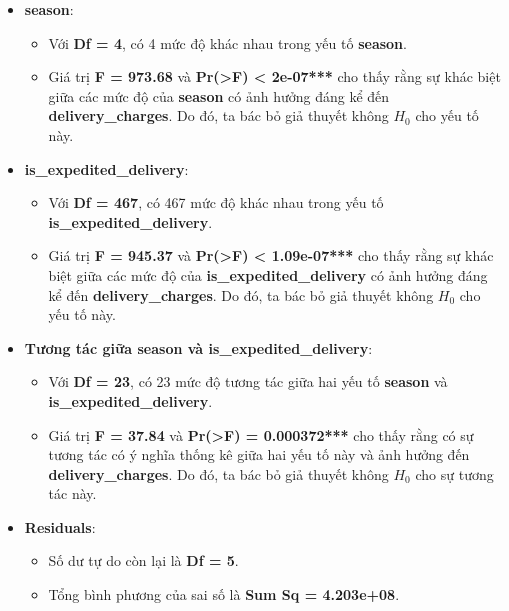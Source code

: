            \begin{itemize}
    \item \textbf{season}:
    \begin{itemize}
        \item Với \textbf{Df = 4}, có 4 mức độ khác nhau trong yếu tố \textbf{season}.
        \item Giá trị \textbf{F = 973.68} và \textbf{Pr(>F) < 2e-07***} cho thấy rằng sự khác biệt giữa các mức độ của \textbf{season} có ảnh hưởng đáng kể đến \textbf{delivery\_charges}. Do đó, ta bác bỏ giả thuyết không \(H_0\) cho yếu tố này.
    \end{itemize}

    \item \textbf{is\_expedited\_delivery}:
    \begin{itemize}
        \item Với \textbf{Df = 467}, có 467 mức độ khác nhau trong yếu tố \textbf{is\_expedited\_delivery}.
        \item Giá trị \textbf{F = 945.37} và \textbf{Pr(>F) < 1.09e-07***} cho thấy rằng sự khác biệt giữa các mức độ của \textbf{is\_expedited\_delivery} có ảnh hưởng đáng kể đến \textbf{delivery\_charges}. Do đó, ta bác bỏ giả thuyết không \(H_0\) cho yếu tố này.
    \end{itemize}

    \item \textbf{Tương tác giữa season và is\_expedited\_delivery}:
    \begin{itemize}
        \item Với \textbf{Df = 23}, có 23 mức độ tương tác giữa hai yếu tố \textbf{season} và \textbf{is\_expedited\_delivery}.
        \item Giá trị \textbf{F = 37.84} và \textbf{Pr(>F) = 0.000372***} cho thấy rằng có sự tương tác có ý nghĩa thống kê giữa hai yếu tố này và ảnh hưởng đến \textbf{delivery\_charges}. Do đó, ta bác bỏ giả thuyết không \(H_0\) cho sự tương tác này.
    \end{itemize}

    \item \textbf{Residuals}:
    \begin{itemize}
        \item Số dư tự do còn lại là \textbf{Df = 5}.
        \item Tổng bình phương của sai số là \textbf{Sum Sq = 4.203e+08}.
    \end{itemize}
    \end{itemize}

